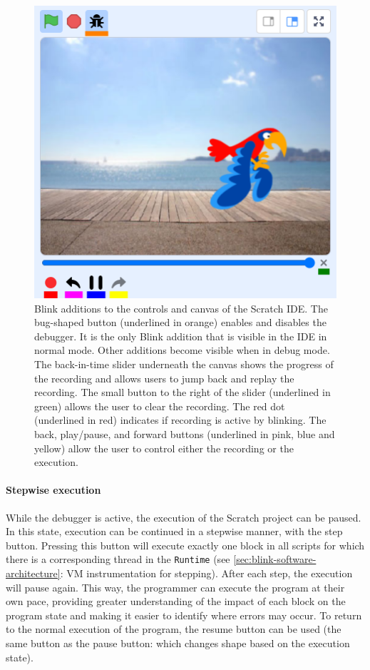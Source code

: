 \documentclass[../main]{subfiles}
\begin{document}
\begin{figure}
    \centering
    \includegraphics[width=\textwidth]{scratch-debugger-ide}
    \caption{
        Blink additions to the controls and canvas of the Scratch IDE.
        The bug-shaped button (underlined in orange) enables and disables the debugger.
        It is the only Blink addition that is visible in the IDE in normal mode.
        Other additions become visible when in debug mode.
        The back-in-time slider underneath the canvas shows the progress of the recording and allows users to jump back and replay the recording.
        The small button to the right of the slider (underlined in green) allows the user to clear the recording.
        The red dot (underlined in red) indicates if recording is active by blinking.
        The back, play/pause, and forward buttons (underlined in pink, blue and yellow) allow the user to control either the recording or the execution.
    }
    \label{fig:blink-ide}
\end{figure}

\paragraph{Stepwise execution}
While the debugger is active, the execution of the Scratch project can be paused.
In this state, execution can be continued in a stepwise manner, with the step button.
Pressing this button will execute exactly one block in all scripts for which there is a corresponding thread in the \texttt{Runtime} (see \cref{sec:blink-software-architecture}: VM instrumentation for stepping).
After each step, the execution will pause again.
This way, the programmer can execute the program at their own pace, providing greater understanding of the impact of each block on the program state and making it easier to identify where errors may occur.
To return to the normal execution of the program, the resume button can be used (the same button as the pause button: which changes shape based on the execution state).
\end{document}
